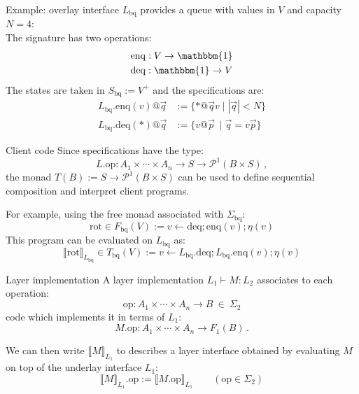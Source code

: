 \documentclass[aspectratio=54]{beamer}
\newcommand{\kw}[1]{\ensuremath{ \mathrm{#1} }}
\begin{document}
\begin{frame}{Example: overlay interface} %
  $L_\kw{bq}$ provides a queue with values in $V$ and capacity $N = 4$:
  \[
  \]
  The signature has two operations:
  \begin{align*}
    \kw{enq} &: V \rightarrow \mathbbm{1} \\
    \kw{deq} &: \mathbbm{1} \rightarrow V
  \end{align*}
  The states are taken in $S_\kw{bq} := V^+$
  and the specifications are:
  \begin{align*}
    L_\kw{bq}.\kw{enq}(v)@\vec{q} &:= \{ * @ \vec{q} v \mid |\vec{q}| < N \} \\
    L_\kw{bq}.\kw{deq}(*)@\vec{q} &:= \{ v @ \vec{p} \: \mid \vec{q} = v \vec{p} \}
  \end{align*}
\end{frame}

\begin{frame}{Client code} %
  Since specifications have the type:
  \[
    L.\kw{op} :
      A_1 \times \cdots \times A_n \rightarrow
      S \rightarrow \mathcal{P}^1(B \times S) \,,
  \]
  the monad $T(B) := S \rightarrow \mathcal{P}^1(B \times S)$
  can be used to define sequential composition and
  interpret client programs.

  For example, using the free monad associated with $\Sigma_\kw{bq}$:
  \[
    \kw{rot} \in F_\kw{bq}(V) :=
      v \leftarrow \kw{deq} \mathop{;}
      \kw{enq}(v) \mathop{;}
      \eta(v)
  \]
  This program can be evaluated on $L_\kw{bq}$ as:
  \[
    \llbracket \kw{rot} \rrbracket_{L_\kw{bq}} \in T_\kw{bq}(V) :=
      v \leftarrow L_\kw{bq}.\kw{deq} \mathop{;}
      L_\kw{bq}.\kw{enq}(v) \mathop{;}
      \eta(v)
  \]
\end{frame}

\begin{frame}{Layer implementation} %
  A layer implementation $L_1 \vdash M : L_2$
  associates to each operation:
  \[
    \kw{op} : A_1 \times \cdots \times A_n \rightarrow B
      \: \in \: \Sigma_2
  \]
  code which implements it in terms of $L_1$:
  \[
    M.\kw{op} : A_1 \times \cdots \times A_n \rightarrow F_1(B) \,.
  \]

  We can then write $\llbracket M \rrbracket_{L_1}$
  to describes a layer interface obtained by
  evaluating $M$
  on top of the underlay interface $L_1$:
  \[
    \llbracket M \rrbracket_{L_1}.\kw{op} :=
      \llbracket M.\kw{op} \rrbracket_{L_1}
    \qquad (\kw{op} \in \Sigma_2)
  \]
\end{frame}
\end{document}
